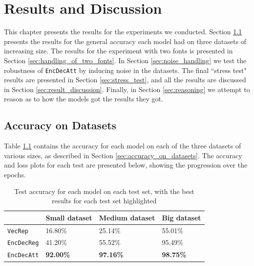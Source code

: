 
\chapter{Results and Discussion}
\label{ch:results}
This chapter presents the results for the experiments we conducted. Section \ref{sec:accuracy_on_datasets_results} presents the results for the general accuracy each model had on three datasets of increasing size. The results for the experiment with two fonts is presented in Section \ref{sec:handling_of_two_fonts}. In Section \ref{sec:noise_handling} we test the robustness of {\tt EncDecAtt} by inducing noise in the datasets. The final ``stress test" results are presented in Section \ref{sec:stress_test}, and all the results are discussed in Section \ref{sec:result_discussion}. Finally, in Section \ref{sec:reasoning} we attempt to reason as to how the models got the results they got.


\section{Accuracy on Datasets}
\label{sec:accuracy_on_datasets_results}
Table \ref{table:accuracy_model_data_sets} contains the accuracy for each model on each of the three datasets of various sizes, as described in Section \ref{sec:accuracy_on_datasets}. The accuracy and loss plots for each test are presented below, showing the progression over the epochs.

\begin{table}[H]
    \centering
    \begin{tabular}{|l|l|l|l|}
        \hline 
                                        & \textbf{Small dataset}          & \textbf{Medium dataset}         & \textbf{Big dataset}            \\ \hline
        {\tt VecRep }                   & 16.80\%                         & 25.14\%                         & 55.01\%                         \\ \hline
        {\tt EncDecReg}                 & 41.20\%                         & 55.52\%                         & 95.49\%                         \\ \hline
        {\tt EncDecAtt}                 & \textbf{92.00\%}                & \textbf{97.16\%}                & \textbf{98.75\%}                \\ \hline
    \end{tabular}
    \caption{Test accuracy for each model on each test set, with the best results for each test set highlighted}
    \label{table:accuracy_model_data_sets}
\end{table}

